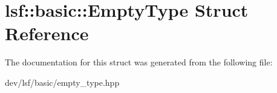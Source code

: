 \hypertarget{structlsf_1_1basic_1_1EmptyType}{
\section{lsf::basic::EmptyType Struct Reference}
\label{structlsf_1_1basic_1_1EmptyType}
}


The documentation for this struct was generated from the following file:\begin{DoxyCompactItemize}
\item 
dev/lsf/basic/empty\_\-type.hpp\end{DoxyCompactItemize}
